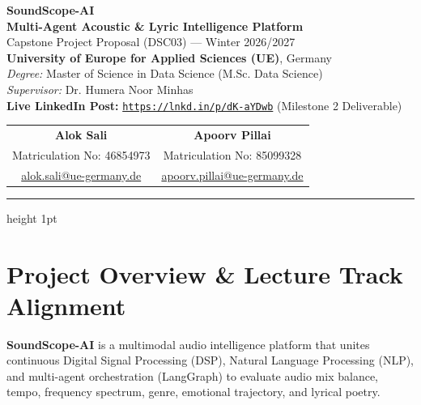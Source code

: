 \documentclass[11pt,a4paper]{article}
\begin{document}
\begin{center}
    {\Huge\bfseries\color{primary} SoundScope-AI}\\[0.3em]
    {\Large\bfseries Multi-Agent Acoustic \& Lyric Intelligence Platform}\\[0.6em]
    {\large\color{secondary} Capstone Project Proposal (DSC03) — Winter 2026/2027}\\[0.4em]
    {\normalsize\textbf{University of Europe for Applied Sciences (UE)}, Germany}\\[0.2em]
    {\normalsize\textit{Degree:} Master of Science in Data Science (M.Sc. Data Science)}\\[0.2em]
    {\normalsize\textit{Supervisor:} Dr. Humera Noor Minhas}\\[0.3em]
    {\small\textbf{Live LinkedIn Post:} \href{https://lnkd.in/p/dK-aYDwb}{\texttt{https://lnkd.in/p/dK-aYDwb}} (Milestone 2 Deliverable)}\\[0.8em]
    
    \begin{tabular}{cc}
        \textbf{Alok Sali} & \textbf{Apoorv Pillai} \\
        Matriculation No: 46854973 & Matriculation No: 85099328 \\
        \href{mailto:alok.sali@ue-germany.de}{\small alok.sali@ue-germany.de} & \href{mailto:apoorv.pillai@ue-germany.de}{\small apoorv.pillai@ue-germany.de}
    \end{tabular}
\end{center}

\vspace{0.5em}
\hrule height 1pt
\vspace{1.2em}

\section{Project Overview \& Lecture Track Alignment}

\textbf{SoundScope-AI} is a multimodal audio intelligence platform that unites continuous Digital Signal Processing (DSP), Natural Language Processing (NLP), and multi-agent orchestration (LangGraph) to evaluate audio mix balance, tempo, frequency spectrum, genre, emotional trajectory, and lyrical poetry.
\end{document}
